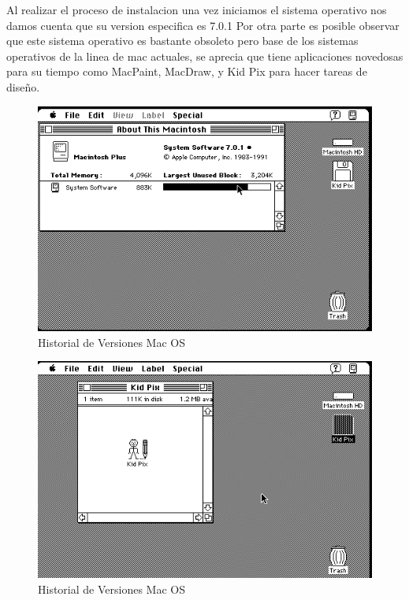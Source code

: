 \documentclass[paper=a4, fontsize=12pt]{article} 		%
\numberwithin{equation}{section}						%
\numberwithin{table}{section} 							%
\begin{document}
Al realizar el proceso de instalacion una vez iniciamos el sistema operativo nos damos cuenta que su version especifica es 7.0.1 Por otra parte es posible observar que este sistema operativo es bastante obsoleto pero base de los sistemas operativos de la linea de mac actuales, se aprecia que tiene aplicaciones novedosas para su tiempo como MacPaint, MacDraw, y Kid Pix para hacer tareas de diseño. 
\begin{center}
\begin{figure}[H]
\includegraphics[scale=0.6]{img/mac1.png}
\caption{Historial de Versiones Mac OS}
\label{fig:dis2}
\end{figure}
\end{center}
\begin{center}
\begin{figure}[H]
\includegraphics[scale=0.6]{img/mac2.png}
\caption{Historial de Versiones Mac OS}
\label{fig:dis2}
\end{figure}
\end{center}
\end{document}
